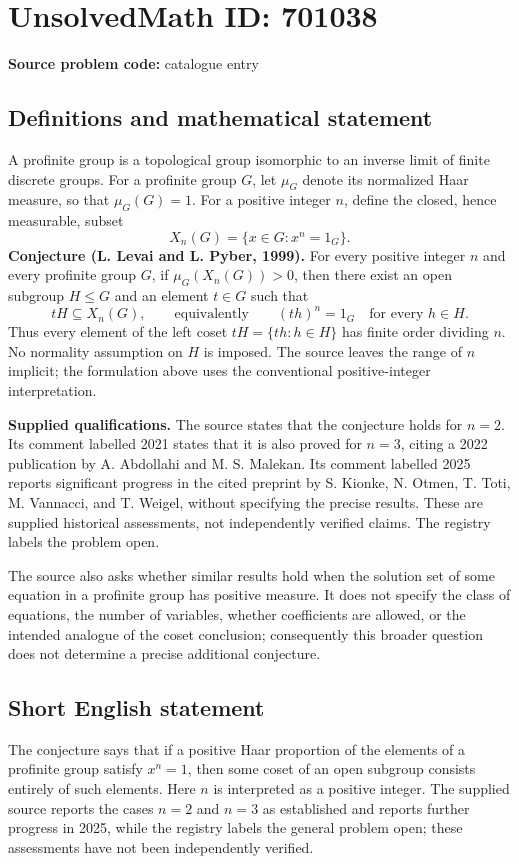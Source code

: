 \documentclass[11pt]{article}
\begin{document}
\section*{UnsolvedMath ID: 701038}
\textbf{Source problem code:} catalogue entry
\subsection{Definitions and mathematical statement}
A profinite group is a topological group isomorphic to an inverse limit of finite discrete groups. For a profinite group $G$, let $\mu_G$ denote its normalized Haar measure, so that $\mu_G(G)=1$. For a positive integer $n$, define the closed, hence measurable, subset
\[
X_n(G)=\{x\in G:x^n=1_G\}.
\]
\textbf{Conjecture (L. Levai and L. Pyber, 1999).} For every positive integer $n$ and every profinite group $G$, if $\mu_G(X_n(G))>0$, then there exist an open subgroup $H\leq G$ and an element $t\in G$ such that
\[
tH\subseteq X_n(G),\qquad\text{equivalently}\qquad (th)^n=1_G\quad\text{for every }h\in H.
\]
Thus every element of the left coset $tH=\{th:h\in H\}$ has finite order dividing $n$. No normality assumption on $H$ is imposed. The source leaves the range of $n$ implicit; the formulation above uses the conventional positive-integer interpretation.

\textbf{Supplied qualifications.} The source states that the conjecture holds for $n=2$. Its comment labelled 2021 states that it is also proved for $n=3$, citing a 2022 publication by A. Abdollahi and M. S. Malekan. Its comment labelled 2025 reports significant progress in the cited preprint by S. Kionke, N. Otmen, T. Toti, M. Vannacci, and T. Weigel, without specifying the precise results. These are supplied historical assessments, not independently verified claims. The registry labels the problem open.

The source also asks whether similar results hold when the solution set of some equation in a profinite group has positive measure. It does not specify the class of equations, the number of variables, whether coefficients are allowed, or the intended analogue of the coset conclusion; consequently this broader question does not determine a precise additional conjecture.
\subsection{Short English statement}
The conjecture says that if a positive Haar proportion of the elements of a profinite group satisfy $x^n=1$, then some coset of an open subgroup consists entirely of such elements. Here $n$ is interpreted as a positive integer. The supplied source reports the cases $n=2$ and $n=3$ as established and reports further progress in 2025, while the registry labels the general problem open; these assessments have not been independently verified.
\end{document}
